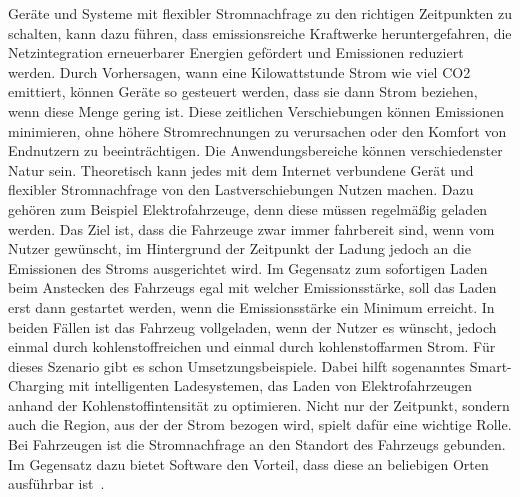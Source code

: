 Geräte und Systeme mit flexibler Stromnachfrage zu den richtigen Zeitpunkten zu schalten, kann dazu führen, dass emissionsreiche Kraftwerke heruntergefahren, die Netzintegration erneuerbarer Energien gefördert und Emissionen reduziert werden.
Durch Vorhersagen, wann eine Kilowattstunde Strom wie viel CO2 emittiert, können Geräte so gesteuert werden, dass sie dann Strom beziehen, wenn diese Menge gering ist.
Diese zeitlichen Verschiebungen können Emissionen minimieren, ohne höhere Stromrechnungen zu verursachen oder den Komfort von Endnutzern zu beeinträchtigen.
Die Anwendungsbereiche können verschiedenster Natur sein.
Theoretisch kann jedes mit dem Internet verbundene Gerät und flexibler Stromnachfrage von den Lastverschiebungen Nutzen machen.
Dazu gehören zum Beispiel Elektrofahrzeuge, denn diese müssen regelmäßig geladen werden.
Das Ziel ist, dass die Fahrzeuge zwar immer fahrbereit sind, wenn vom Nutzer gewünscht, im Hintergrund der Zeitpunkt der Ladung jedoch an die Emissionen des Stroms ausgerichtet wird.
Im Gegensatz zum sofortigen Laden beim Anstecken des Fahrzeugs egal mit welcher Emissionsstärke, soll das Laden erst dann gestartet werden, wenn die Emissionsstärke ein Minimum erreicht.
In beiden Fällen ist das Fahrzeug vollgeladen, wenn der Nutzer es wünscht, jedoch einmal durch kohlenstoffreichen und einmal durch kohlenstoffarmen Strom.
Für dieses Szenario gibt es schon Umsetzungsbeispiele.
Dabei hilft sogenanntes \glqq Smart-Charging\grqq{} mit intelligenten Ladesystemen, das Laden von Elektrofahrzeugen anhand der Kohlenstoffintensität zu optimieren.
Nicht nur der Zeitpunkt, sondern auch die Region, aus der der Strom bezogen wird, spielt dafür eine wichtige Rolle.
Bei Fahrzeugen ist die Stromnachfrage an den Standort des Fahrzeugs gebunden.
Im Gegensatz dazu bietet Software den Vorteil, dass diese an beliebigen Orten ausführbar ist~\cite{WattTime.12.3.2024}.

